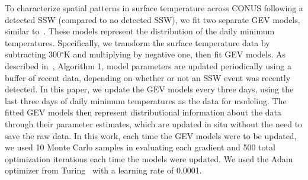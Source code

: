 \documentclass{juliacon}
\begin{document}
To characterize spatial patterns in surface temperature across CONUS following a detected SSW (compared to no detected SSW), we fit two separate GEV models, similar to~\cite{ssw_isav}. These models represent the distribution of the daily minimum temperatures. Specifically, we transform the surface temperature data by subtracting 300$^\circ$K and multiplying by negative one, then fit GEV models. As described in~\cite{ssw_isav}, Algorithm 1, model parameters are updated periodically using a buffer of recent data, depending on whether or not an SSW event was recently detected. In this paper, we update the GEV models every three days, using the last three days of daily minimum temperatures as the data for modeling. The fitted GEV models then represent distributional information about the data through their parameter estimates, which are updated in situ without the need to save the raw data. In this work, each time the GEV models were to be updated, we used 10 Monte Carlo samples in evaluating each gradient and 500 total optimization iterations each time the models were updated. We used the Adam optimizer from Turing~\cite{ge2018turing} with a learning rate of 0.0001. 
\end{document}
